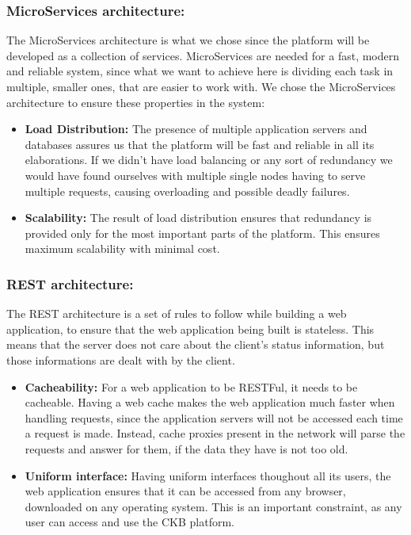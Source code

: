 \documentclass{article}
\begin{document}
{    \subsubsection{MicroServices architecture:} The MicroServices architecture is what we chose since the platform will be developed as a collection of 
    services. MicroServices are needed for a fast, modern and reliable system, since what we want to achieve here is dividing each task in multiple, 
    smaller ones, that are easier to work with.
    We chose the MicroServices architecture to ensure these properties in the system:
    \begin{itemize}
        \item \textbf{Load Distribution:} The presence of multiple application servers and databases assures us that the platform will be fast 
        and reliable in all its elaborations. If we didn't have load balancing or any sort of redundancy we would have found ourselves with multiple
        single nodes having to serve multiple requests, causing overloading and possible deadly failures.
        \item \textbf{Scalability:} The result of load distribution ensures that redundancy is provided only for the most important parts of the platform.
        This ensures maximum scalability with minimal cost.
    \end{itemize}
    \subsubsection{REST architecture:}
    The REST architecture is a set of rules to follow while building a web application, to ensure that the web application being built is stateless.
    This means that the server does not care about the client's status information, but those informations are dealt with by the client.
    \begin{itemize}
    \item \textbf{Cacheability:} For a web application to be RESTFul, it needs to be cacheable. Having a web cache makes the web application much faster when handling 
    requests, since the application servers will not be accessed each time a request is made. Instead, cache proxies present in the network will parse the requests and
     answer for them, if the data they have is not too old.
    \item \textbf{Uniform interface:} Having uniform interfaces thoughout all its users, the web application ensures that it can be accessed from any browser, downloaded
    on any operating system. This is an important constraint, as any user can access and use the CKB platform.
    \end{itemize}
}
\end{document}
